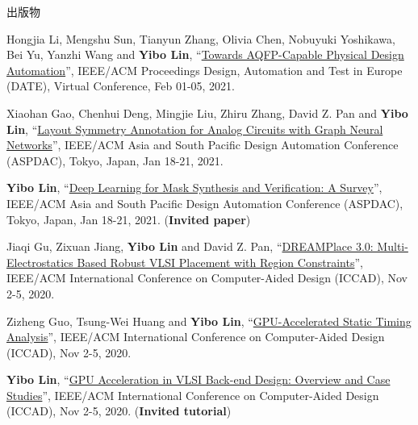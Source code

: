 \begin{rSection}{出版物}
\begin{description}[font=\normalfont, rightmargin=2em]
{}
            

\item[{[C45]}]{
        Hongjia Li, Mengshu Sun, Tianyun Zhang, Olivia Chen, Nobuyuki Yoshikawa, Bei Yu, Yanzhi Wang and \textbf{Yibo Lin}, 
    ``\href{https://doi.org/10.23919/DATE51398.2021.9474259}{Towards AQFP-Capable Physical Design Automation}'', 
    IEEE/ACM Proceedings Design, Automation and Test in Europe (DATE), Virtual Conference, Feb 01-05, 2021.
    
}
            

\item[{[C44]}]{
        Xiaohan Gao, Chenhui Deng, Mingjie Liu, Zhiru Zhang, David Z. Pan and \textbf{Yibo Lin}, 
    ``\href{https://doi.org/10.1145/3394885.3431545}{Layout Symmetry Annotation for Analog Circuits with Graph Neural Networks}'', 
    IEEE/ACM Asia and South Pacific Design Automation Conference (ASPDAC), Tokyo, Japan, Jan 18-21, 2021.
    
}
            

\item[{[C43]}]{
        \textbf{Yibo Lin}, 
    ``\href{https://doi.org/10.1145/3394885.3431624}{Deep Learning for Mask Synthesis and Verification: A Survey}'', 
    IEEE/ACM Asia and South Pacific Design Automation Conference (ASPDAC), Tokyo, Japan, Jan 18-21, 2021.
    (\textbf{Invited paper})
}
            

\item[{[C42]}]{
        Jiaqi Gu, Zixuan Jiang, \textbf{Yibo Lin} and David Z. Pan, 
    ``\href{https://doi.org/10.1145/3400302.3415691}{DREAMPlace 3.0: Multi-Electrostatics Based Robust VLSI Placement with Region Constraints}'', 
    IEEE/ACM International Conference on Computer-Aided Design (ICCAD), Nov 2-5, 2020.
    
}
            

\item[{[C41]}]{
        Zizheng Guo, Tsung-Wei Huang and \textbf{Yibo Lin}, 
    ``\href{https://doi.org/10.1145/3400302.3415631}{GPU-Accelerated Static Timing Analysis}'', 
    IEEE/ACM International Conference on Computer-Aided Design (ICCAD), Nov 2-5, 2020.
    
}
            

\item[{[C40]}]{
        \textbf{Yibo Lin}, 
    ``\href{https://doi.org/10.1145/3400302.3415765}{GPU Acceleration in VLSI Back-end Design: Overview and Case Studies}'', 
    IEEE/ACM International Conference on Computer-Aided Design (ICCAD), Nov 2-5, 2020.
    (\textbf{Invited tutorial})
}
            


\end{description}
\end{rSection}
